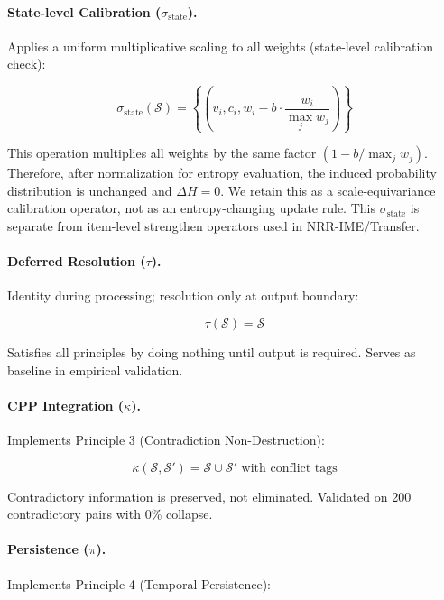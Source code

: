 \documentclass[11pt,a4paper]{article}
\begin{document}
\paragraph{State-level Calibration ($\sigma_{\mathrm{state}}$).}
Applies a uniform multiplicative scaling to all weights (state-level calibration check):

\begin{equation}
\sigma_{\mathrm{state}}(\mathcal{S}) = \left\{
  \left(v_i, c_i, w_i - b \cdot \frac{w_i}{\max_j w_j}\right)
\right\}
\end{equation}

This operation multiplies all weights by the same factor
$\left(1 - b/\max_j w_j\right)$.
Therefore, after normalization for entropy evaluation, the induced probability
distribution is unchanged and $\Delta H = 0$. We retain this as a
scale-equivariance calibration operator, not as an entropy-changing update rule.
This $\sigma_{\mathrm{state}}$ is separate from item-level strengthen operators
used in NRR-IME/Transfer.

\paragraph{Deferred Resolution ($\tau$).}
Identity during processing; resolution only at output boundary:

\begin{equation}
\tau(\mathcal{S}) = \mathcal{S}
\end{equation}

Satisfies all principles by doing nothing until output is required. 
Serves as baseline in empirical validation.

\paragraph{CPP Integration ($\kappa$).}
Implements Principle 3 (Contradiction Non-Destruction):

\begin{equation}
\kappa(\mathcal{S}, \mathcal{S}') = \mathcal{S} \cup \mathcal{S}' 
\text{ with conflict tags}
\end{equation}

Contradictory information is preserved, not eliminated. Validated on 
200 contradictory pairs with 0\% collapse.

\paragraph{Persistence ($\pi$).}
Implements Principle 4 (Temporal Persistence):
\end{document}
